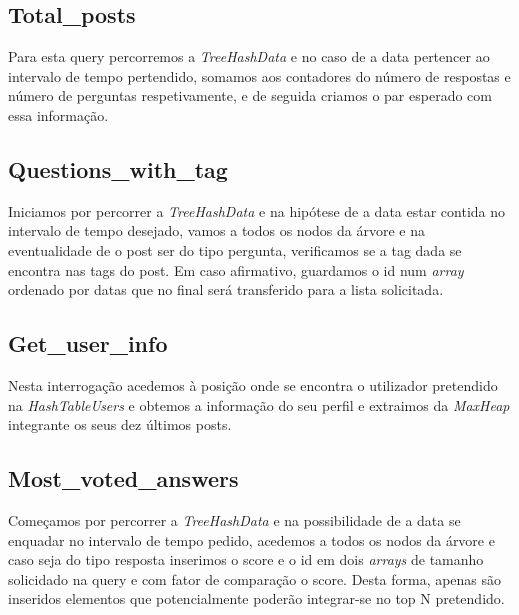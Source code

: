 \documentclass[10pt,a4paper]{article}
\begin{document}
{\subsection{Total\_posts}
Para esta query percorremos a \textit{TreeHashData} e no caso de a data pertencer ao intervalo de tempo pertendido, somamos aos contadores do número de respostas e número de perguntas respetivamente, e de seguida criamos o par esperado com essa informação.

\subsection{Questions\_with\_tag}
Iniciamos por percorrer a \textit{TreeHashData} e na hipótese de a data estar contida no intervalo de tempo desejado, vamos a todos os nodos da árvore e na eventualidade de o post ser do tipo pergunta, verificamos se a tag dada se encontra nas tags do post. Em caso afirmativo, guardamos o id num \textit{array} ordenado por datas que no final será transferido para a lista solicitada.

\subsection{Get\_user\_info}
Nesta interrogação acedemos à posição onde se encontra o utilizador pretendido na \textit{HashTableUsers} e obtemos a informação do
seu perfil e extraimos da \textit{MaxHeap} integrante os seus dez últimos posts.

\subsection{Most\_voted\_answers}
Começamos por percorrer a \textit{TreeHashData} e na possibilidade de a data se enquadar no intervalo de tempo pedido, acedemos a todos os nodos da árvore e caso seja do tipo resposta inserimos o score e o id em dois \textit{arrays} de tamanho solicidado na query  e com fator de comparação o score. Desta forma, apenas são inseridos elementos que potencialmente poderão integrar-se no top N pretendido.

}
\end{document}
